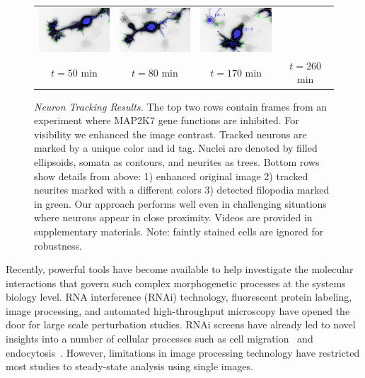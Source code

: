 \begin{figure}[t]
\begin{tabular}{@{}c@{}c@{}c@{}c@{}}
        \includegraphics[width=31mm] {images/3_008.png} & 
        \includegraphics[width=31mm] {images/3_017.png} & 
        \includegraphics[width=31mm] {images/3_026.png} \\ [-3.5ex]
        {\footnotesize $t = 50$ min} & 
        {\footnotesize $t = 80$ min} & 
        {\footnotesize $t = 170$ min} & 
        {\footnotesize $t = 260$ min} \\ [-1ex]
      \end{tabular}
    \vspace{-2mm}  
    \caption{ {\footnotesize {\it Neuron  Tracking Results.  } The top
        two rows  contain frames from an experiment  where MAP2K7 gene
        functions are inhibited.  For visibility we enhanced the image
        contrast.  Tracked neurons are marked by a unique color and id
        tag.   Nuclei  are denoted  by  filled  ellipsoids, somata  as
        contours,  and neurites  as trees.   Bottom rows  show details
        from  above: 1)  enhanced original  image 2)  tracked neurites
        marked with a different colors 3) detected filopodia marked in
        green.   Our  approach   performs  well  even  in  challenging
        situations where neurons appear in close proximity. Videos are
        provided  in supplementary  materials.  Note: faintly  stained
        cells are ignored for robustness.}}
    \label{fig:video}
\end{figure}


Recently, powerful tools have become available to help investigate the
molecular   interactions  that   govern  such   complex  morphogenetic
processes  at  the systems  biology  level.   RNA interference  (RNAi)
technology,  fluorescent  protein   labeling,  image  processing,  and
automated high-throughput  microscopy have  opened the door  for large
scale  perturbation studies. RNAi  screens have  already led  to novel
insights   into  a  number   of  cellular   processes  such   as  cell
migration~\cite{Bakal07}  and endocytosis~\cite{Collinet10}.  However,
limitations  in  image  processing  technology  have  restricted  most
studies to steady-state analysis using single images.

